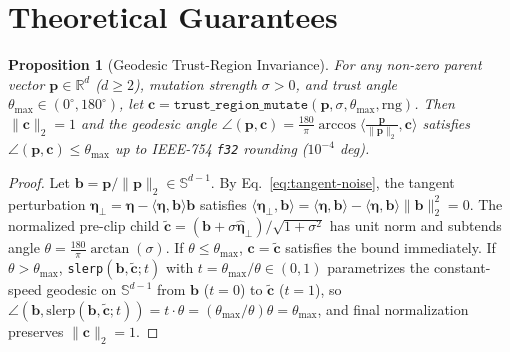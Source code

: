 \documentclass[11pt]{article}
\newtheorem{proposition}{Proposition}
\begin{document}
\section{Theoretical Guarantees}

\begin{proposition}[Geodesic Trust-Region Invariance]
\label{prop:trust-region}
For any non-zero parent vector $\mathbf{p} \in \mathbb{R}^d$ ($d \ge 2$), mutation strength $\sigma > 0$, and trust angle $\theta_{\max} \in (0^\circ, 180^\circ)$, let $\mathbf{c} = \texttt{trust\_region\_mutate}(\mathbf{p}, \sigma, \theta_{\max}, \text{rng})$. Then $\|\mathbf{c}\|_2 = 1$ and the geodesic angle $\angle(\mathbf{p}, \mathbf{c}) = \frac{180}{\pi}\arccos\langle \frac{\mathbf{p}}{\|\mathbf{p}\|_2}, \mathbf{c} \rangle$ satisfies $\angle(\mathbf{p}, \mathbf{c}) \le \theta_{\max}$ up to IEEE-754 \texttt{f32} rounding ($10^{-4}$ deg).
\end{proposition}
\begin{proof}
Let $\mathbf{b} = \mathbf{p} / \|\mathbf{p}\|_2 \in \mathbb{S}^{d-1}$. By Eq.~\eqref{eq:tangent-noise}, the tangent perturbation $\boldsymbol{\eta}_{\perp} = \boldsymbol{\eta} - \langle \boldsymbol{\eta}, \mathbf{b}\rangle \mathbf{b}$ satisfies $\langle \boldsymbol{\eta}_{\perp}, \mathbf{b} \rangle = \langle \boldsymbol{\eta}, \mathbf{b} \rangle - \langle \boldsymbol{\eta}, \mathbf{b} \rangle \|\mathbf{b}\|_2^2 = 0$. The normalized pre-clip child $\tilde{\mathbf{c}} = (\mathbf{b} + \sigma \hat{\boldsymbol{\eta}}_{\perp}) / \sqrt{1 + \sigma^2}$ has unit norm and subtends angle $\theta = \frac{180}{\pi}\arctan(\sigma)$. If $\theta \le \theta_{\max}$, $\mathbf{c} = \tilde{\mathbf{c}}$ satisfies the bound immediately. If $\theta > \theta_{\max}$, \texttt{slerp}$(\mathbf{b}, \tilde{\mathbf{c}}; t)$ with $t = \theta_{\max}/\theta \in (0, 1)$ parametrizes the constant-speed geodesic on $\mathbb{S}^{d-1}$ from $\mathbf{b}$ ($t=0$) to $\tilde{\mathbf{c}}$ ($t=1$), so $\angle(\mathbf{b}, \text{slerp}(\mathbf{b}, \tilde{\mathbf{c}}; t)) = t \cdot \theta = (\theta_{\max}/\theta)\theta = \theta_{\max}$, and final normalization preserves $\|\mathbf{c}\|_2 = 1$.
\end{proof}
\end{document}
